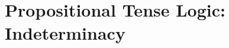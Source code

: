 \documentclass[a4paper, 11pt]{article} %
\begin{document}
\begin{enumerate}[leftmargin=1.2in]
\end{enumerate}


\section*{\sc Propositional Tense Logic: Indeterminacy}
  
\end{document}
